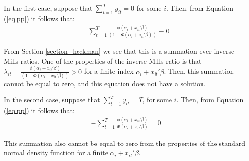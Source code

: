 In the first case, suppose that $\sum_{t=1}^T y_{it} = 0$ for some $i$. Then, from Equation (\ref{eq:pp}) it follows that:
\begin{align*}
    -\sum_{t=1}^T \frac{\phi (\alpha_i + x_{it}' \beta)}{(1-\Phi(\alpha_i + x_{it}' \beta))}  = 0
\end{align*}

From Section \ref{section_heckman} we see that this is a summation over inverse Mills-ratios. One of the properties of the inverse Mills ratio is that $\lambda_{it} = \frac{\phi (\alpha_i + x_{it}' \beta)}{(1-\Phi(\alpha_i + x_{it}' \beta))} > 0$ for a finite index $\alpha_i + x_{it}' \beta$. Then, this summation cannot be equal to zero, and this equation does not have a solution.

In the second case, suppose that $\sum_{t=1}^T y_{it} = T$, for some $i$. Then, from Equation (\ref{eq:pp}) it follows that:
\begin{align*}
    -\sum_{t=1}^T \frac{\phi (\alpha_i + x_{it}' \beta)}{\Phi(\alpha_i + x_{it}' \beta)}  = 0
\end{align*}

This summation also cannot be equal to zero from the properties of the standard normal density function for a finite $\alpha_i + x_{it}' \beta$.






